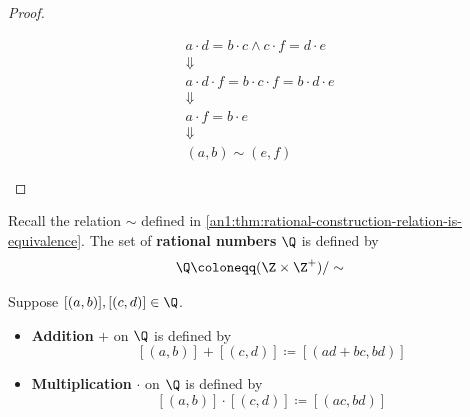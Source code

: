 \begin{proof}
\begin{itemize}
\[\begin{array}{c}
              a \cdot d = b \cdot c \land c \cdot f = d \cdot e         \\
              \Downarrow                                                \\
              a \cdot d \cdot f = b \cdot c \cdot f = b \cdot d \cdot e \\
              \Downarrow                                                \\
              a \cdot f = b \cdot e                                     \\
              \Downarrow                                                \\
              (a, b) \sim (e, f)
            \end{array}
          \]
  \end{itemize}
\end{proof}

\begin{definition} \label{an1:def:rational-number-system}
  Recall the relation $\sim$ defined in \cref{an1:thm:rational-construction-relation-is-equivalence}.
  The set of \textbf{rational numbers} $\Q$ is defined by
  \[
    \Q \coloneqq (\Z \times \Z^{+}) / \sim
  \]
\end{definition}

\begin{definition} \label{an1:def:operations-on-Q}
  Suppose $[(a, b)], [(c, d)] \in \Q$.
  \begin{itemize}
    \item \textbf{Addition} $+$ on $\Q$ is defined by
          \[
            [(a, b)] + [(c, d)] \coloneqq [(ad + bc, bd)]
          \]
    \item \textbf{Multiplication} $\cdot$ on $\Q$ is defined by
          \[
            [(a, b)] \cdot [(c, d)] \coloneqq [(ac, bd)]
          \]
  \end{itemize}
\end{definition}

